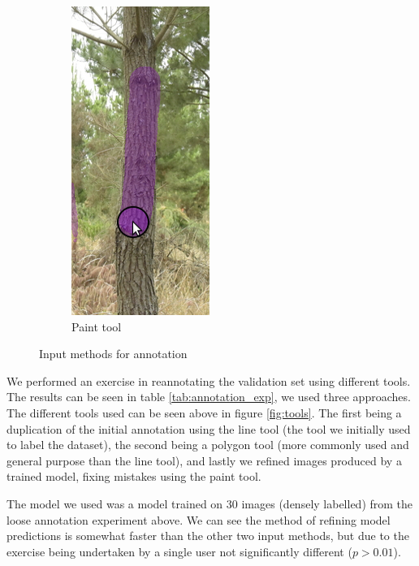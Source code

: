 \documentclass{article}
\begin{document}
\begin{figure}[h!]
\begin{subfigure}[t]{.3\textwidth}
  \includegraphics[width=0.6\linewidth]{images/paint_tool.png}
  \caption{Paint tool}
\end{subfigure}%
\caption{Input methods for annotation}
\label{fig:tree}
\end{figure}



We performed an exercise in reannotating the validation set using different tools. The results can be seen in table \ref{tab:annotation_exp}, we used three approaches. The different tools used can be seen above in figure \ref{fig:tools}.  The first being a duplication of the initial annotation using the line tool (the tool we initially used to label the dataset), the second being a polygon tool (more commonly used and general purpose than the line tool), and lastly we refined images produced by a trained model, fixing mistakes using the paint tool.

The model we used was a model trained on 30 images (densely labelled) from the loose annotation experiment above. We can see the method of refining model predictions is somewhat faster than the other two input methods, but due to the exercise being undertaken by a single user not significantly different ($ p > 0.01 $).
\end{document}
